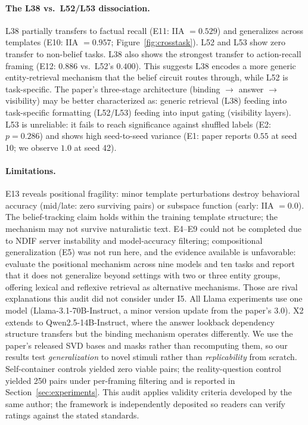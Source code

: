 \documentclass{article}
\begin{document}
\paragraph{The L38 vs.\ L52/L53 dissociation.}
L38 partially transfers to factual recall (E11: IIA $= 0.529$) and generalizes across templates (E10: IIA $= 0.957$; Figure~\ref{fig:crosstask}). L52 and L53 show zero transfer to non-belief tasks. L38 also shows the strongest transfer to action-recall framing (E12: $0.886$ vs.\ L52's $0.400$). This suggests L38 encodes a more generic entity-retrieval mechanism that the belief circuit routes through, while L52 is task-specific. The paper's three-stage architecture (binding $\to$ answer $\to$ visibility) may be better characterized as: generic retrieval (L38) feeding into task-specific formatting (L52/L53) feeding into input gating (visibility layers). L53 is unreliable: it fails to reach significance against shuffled labels (E2: $p = 0.286$) and shows high seed-to-seed variance (E1: paper reports $0.55$ at seed 10; we observe $1.0$ at seed 42).

\paragraph{Limitations.}
E13 reveals positional fragility: minor template perturbations destroy behavioral accuracy (mid/late: zero surviving pairs) or subspace function (early: IIA $= 0.0$). The belief-tracking claim holds within the training template structure; the mechanism may not survive naturalistic text. E4--E9 could not be completed due to NDIF server instability and model-accuracy filtering; compositional generalization (E5) was not run here, and the evidence available is unfavorable: \citet{gurarieh2025mixing} evaluate the positional mechanism across nine models and ten tasks and report that it does not generalize beyond settings with two or three entity groups, offering lexical and reflexive retrieval as alternative mechanisms. Those are rival explanations this audit did not consider under I5. All Llama experiments use one model (Llama-3.1-70B-Instruct, a minor version update from the paper's 3.0). X2 extends to Qwen2.5-14B-Instruct, where the answer lookback dependency structure transfers but the binding mechanism operates differently. We use the paper's released SVD bases and masks rather than recomputing them, so our results test \emph{generalization} to novel stimuli rather than \emph{replicability} from scratch. Self-container controls yielded zero viable pairs; the reality-question control yielded 250 pairs under per-framing filtering and is reported in Section~\ref{sec:experiments}. This audit applies validity criteria developed by the same author; the framework is independently deposited so readers can verify ratings against the stated standards.
\end{document}
